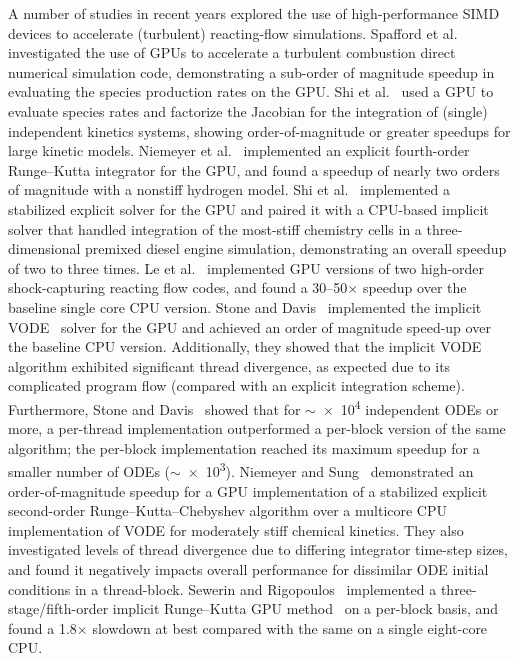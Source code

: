 \documentclass[preprint]{elsarticle}
\begin{document}
A number of studies in recent years explored the use of high-performance SIMD devices to accelerate (turbulent) reacting-flow simulations.
Spafford et al.~\cite{Spafford:2010aa} investigated the use of GPUs to accelerate a turbulent combustion direct numerical simulation code, demonstrating a sub-order of magnitude speedup in evaluating the species production rates on the GPU.
Shi et al.~\cite{Shi:2011aa} used a GPU to evaluate species rates and factorize the Jacobian for the integration of (single) independent kinetics systems, showing order-of-magnitude or greater speedups for large kinetic models.
Niemeyer et al.~\cite{Niemeyer:2011aa} implemented an explicit fourth-order Runge--Kutta integrator for the GPU, and found a speedup of nearly two orders of magnitude with a nonstiff hydrogen model.
Shi et al.~\cite{Shi:2012aa} implemented a stabilized explicit solver for the GPU and paired it with a CPU-based implicit solver that handled integration of the most-stiff chemistry cells in a three-dimensional premixed diesel engine simulation, demonstrating an overall speedup of two to three times.
Le et al.~\cite{Le2013596} implemented GPU versions of two high-order shock-capturing reacting flow codes, and found a \numrange{30}{50}$\times$ speedup over the baseline single core CPU version.
Stone and Davis~\cite{Stone:2013aa} implemented the implicit VODE~\cite{Brown:1989vl} solver for the GPU and achieved an order of magnitude speed-up over the baseline CPU version.
Additionally, they showed that the implicit VODE algorithm exhibited significant thread divergence, as expected due to its complicated program flow (compared with an explicit integration scheme).
Furthermore, Stone and Davis~\cite{Stone:2013aa} showed that for $\sim$\num{e4} independent ODEs or more, a per-thread implementation outperformed a per-block version of the same algorithm; the per-block implementation reached its maximum speedup for a smaller number of ODEs ($\sim$\num{e3}).
Niemeyer and Sung~\cite{Niemeyer:2014aa} demonstrated an order-of-magnitude speedup for a GPU implementation of a stabilized explicit second-order Runge--Kutta--Chebyshev algorithm over a multicore CPU implementation of VODE for moderately stiff chemical kinetics.
They also investigated levels of thread divergence due to differing integrator time-step sizes, and found it negatively impacts overall performance for dissimilar ODE initial conditions in a thread-block.
Sewerin and Rigopoulos~\cite{Sewerin20151375} implemented a three-stage\slash fifth-order implicit Runge--Kutta GPU method~\cite{wanner1991solving} on a per-block basis, and found a \num{1.8}$\times$ slowdown at best compared with the same on a single eight-core CPU.
\end{document}
